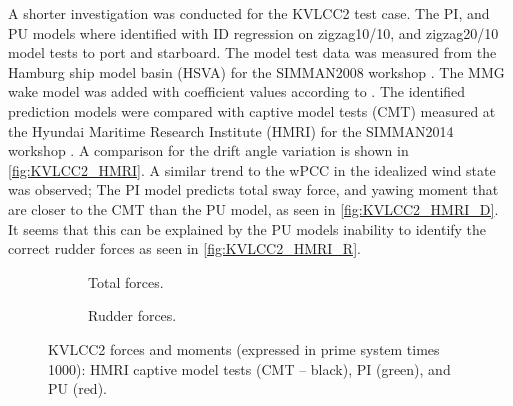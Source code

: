 A shorter investigation was conducted for the KVLCC2 test case. The PI, and PU models where identified with ID regression on zigzag10/10, and zigzag20/10 model tests to port and starboard. The model test data was measured from the Hamburg ship model basin (HSVA) for the SIMMAN2008 workshop \citep{stern_experience_2011}.
The MMG wake model was added with coefficient values according to \citet{yasukawa_introduction_2015}.
The identified prediction models were compared with captive model tests (CMT) measured at the Hyundai Maritime Research Institute (HMRI) for the SIMMAN2014 workshop \citep{ittc_final_2017}. A comparison for the drift angle variation is shown in \autoref{fig:KVLCC2_HMRI}. 
A similar trend to the wPCC in the idealized wind state was observed; The PI model predicts total sway force, and yawing moment that are closer to the CMT than the PU model, as seen in \autoref{fig:KVLCC2_HMRI_D}.
It seems that this can be explained by the PU models inability to identify the correct rudder forces as seen in \autoref{fig:KVLCC2_HMRI_R}.
%
\begin{figure}
    \centering
    \begin{subfigure}[b]{0.49\textwidth}
        \centering
        
        \caption{Total forces.}
        \label{fig:KVLCC2_HMRI_D}
    \end{subfigure}
    \hfill
    \begin{subfigure}[b]{0.49\textwidth}
        \centering
        
        \caption{Rudder forces.}
        \label{fig:KVLCC2_HMRI_R}
    \end{subfigure}
    \caption{KVLCC2 forces and moments (expressed in prime system times 1000): HMRI captive model tests (CMT -- black), PI (green), and PU (red).}
    \label{fig:KVLCC2_HMRI}
\end{figure}
